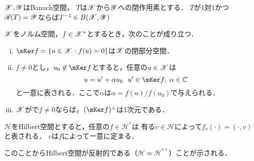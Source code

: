     \begin{Cor}[系7.34, p.172] \label{cor7:34}
        $\mathscr{X}, \mathscr{Y}$はBanach空間，
        $T$は$\mathscr{X}$から$\mathscr{Y}$への閉作用素とする．
        $T$が1対1かつ$\mathscr{R}(T)=\mathscr{Y}$ならば$T^{-1} \in B(\mathscr{X}, \mathscr{Y})$
    \end{Cor}


    \begin{Them}[定理8.3, p.176] \label{them8:3}
        $\mathscr{X}$をノルム空間，$f \in \mathscr{X}^{\ast}$とするとき，次のことが成り立つ．
        \begin{enumerate}[i)]
            \setlength{\leftskip}{5truemm}
            \item $\mKer f=\{ u \in \spX : f(u)=0 \}$は$\mathscr{X}$の閉部分空間．
            \item $f\neq 0$とし，$u_0 \not \in \mKer f$とすると，任意の$u \in \mathscr{X}$は
                  \[ u=u'+\alpha u_0 ~~ u' \in \mKer f,~ \alpha \in \C \]
                  と一意に表される．ここで$\alpha$は$\alpha = f(u)/f(u_0)$で与えられる．
              \item $\mathscr{X}$がで$f \neq 0$ならば，$(\mKer f)^{\perp}$は1次元である．
        \end{enumerate}
    \end{Them}
    \begin{Them}[定理8.5, p.177, Rieszの表現定理] \label{them8:5}
        $\mathscr{H}$をHilbert空間とすると，任意の$f \in \mathscr{H}^{\ast}$は
        有る$v \in \mathscr{H}$によって$f_v(\cdot)=(\cdot,v)$と表される．
        $v$は$f$によって一意に定まる．
    \end{Them}
    このことからHilbert空間が反射的である（$\mathscr{H} \simeq \mathscr{H}^{\ast\ast}$）ことが示される．


